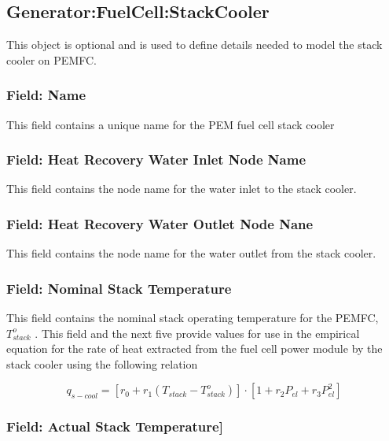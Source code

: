 \subsection{Generator:FuelCell:StackCooler}\label{generatorfuelcellstackcooler}

This object is optional and is used to define details needed to model the stack cooler on PEMFC.

\subsubsection{Field: Name}\label{field-name-15-001}

This field contains a unique name for the PEM fuel cell stack cooler

\subsubsection{Field: Heat Recovery Water Inlet Node Name}\label{field-heat-recovery-water-inlet-node-name-1}

This field contains the node name for the water inlet to the stack cooler.

\subsubsection{Field: Heat Recovery Water Outlet Node Nane}\label{field-heat-recovery-water-outlet-node-nane}

This field contains the node name for the water outlet from the stack cooler.

\subsubsection{Field: Nominal Stack Temperature}\label{field-nominal-stack-temperature}

This field contains the nominal stack operating temperature for the PEMFC, \(T_{stack}^o\) . This field and the next five provide values for use in the empirical equation for the rate of heat extracted from the fuel cell power module by the stack cooler using the following relation

\begin{equation}
{q_{s - cool}} = \left[ {{r_0} + {r_1}\left( {{T_{stack}} - T_{stack}^o} \right)} \right] \cdot \left[ {1 + {r_2}{P_{el}} + {r_3}P_{el}^2} \right]
\end{equation}

\subsubsection{Field: Actual Stack Temperature{]}}\label{field-actual-stack-temperature}

